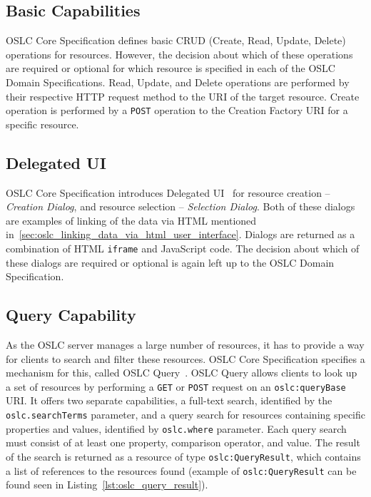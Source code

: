 \subsection*{Basic Capabilities}
\label{sec:oslc_basic_capabilities}
OSLC Core Specification defines basic CRUD (Create, Read, Update, Delete) operations for resources. However, the decision about which of these operations are required or optional for which resource is specified in each of the OSLC Domain Specifications. Read, Update, and Delete operations are performed by their respective HTTP request method to the URI of the target resource. Create operation is performed by a \texttt{POST} operation to the Creation Factory URI for a specific resource.

\subsection*{Delegated UI}
OSLC Core Specification introduces Delegated UI \cite{oslc_core_delegated_ui} for resource creation -- \emph{Creation Dialog}, and resource selection -- \emph{Selection Dialog}. Both of these dialogs are examples of linking of the data via HTML mentioned in \ref{sec:oslc_linking_data_via_html_user_interface}. Dialogs are returned as a combination of HTML \texttt{iframe} and JavaScript code. The decision about which of these dialogs are required or optional is again left up to the OSLC Domain Specification.

\subsection*{Query Capability}
As the OSLC server manages a large number of resources, it has to provide a way for clients to search and filter these resources. OSLC Core Specification specifies a mechanism for this, called OSLC Query \cite{oslc_core_query}. OSLC Query allows clients to look up a set of resources by performing a \texttt{GET} or \texttt{POST} request on an \texttt{oslc:queryBase} URI. It offers two separate capabilities, a full-text search, identified by the \texttt{oslc.searchTerms} parameter, and a query search for resources containing specific properties and values, identified by \texttt{oslc.where} parameter. Each query search must consist of at least one property, comparison operator, and value. The result of the search is returned as a resource of type \texttt{oslc:QueryResult}, which contains a list of references to the resources found (example of \texttt{oslc:QueryResult} can be found seen in Listing \ref{lst:oslc_query_result}).

